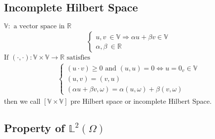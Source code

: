 \documentclass[a4paper,12pt]{article}
\newcommand{\R}{\mathbb{R}}
\newcommand{\Vspace}{\mathbb{V}}
\newcommand{\Lspace}{\mathbb{L}}
\begin{document}
\subsection{Incomplete Hilbert Space}
$\Vspace : \text{ a vector space in } \R$
\begin{equation}\nonumber
\begin{aligned}
\begin{cases}
u,v\ \in \Vspace \Rightarrow \alpha u + \beta v \in \Vspace\\
\alpha,\beta\ \in \R
\end{cases}
\end{aligned}
\end{equation}
$\text{If } (\cdot,\cdot) : \Vspace \times \Vspace \rightarrow \R \text{ satisfies}$
\begin{equation}\nonumber
\begin{aligned}
\begin{cases}
(u\cdot v) \geq 0 \text{ and } (u,u) = 0 \Leftrightarrow u = 0_v \in \Vspace\\
(u,v) = (v,u)\\
(\alpha u + \beta v, \omega) = \alpha(u,\omega) + \beta (v,\omega)
\end{cases}
\end{aligned}
\end{equation}
then we call $[\Vspace \times \Vspace]$ pre Hilbert space or incomplete Hilbert Space.
\subsection{Property of $\Lspace^2(\Omega)$}
\end{document}
